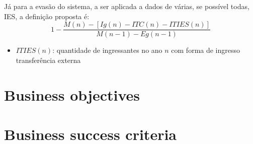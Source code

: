 \documentclass{article}
\begin{document}
Já para a evasão do sistema, a ser aplicada a dados de várias, se possível todas, IES, a definição proposta é:
\begin{equation}
1 - \frac{M(n) - [Ig(n) - ITC(n) - ITIES(n)]}{M(n-1) - Eg(n-1)}
\end{equation}
\begin{itemize}
\item $ITIES(n)$: quantidade de ingressantes no ano $n$ com forma de ingresso transferência externa
\end{itemize}


\section{Business objectives}

\section{Business success criteria}

\cite{anuario_2014_base_2013}
\cite{pdi_ufc}



\end{document}
